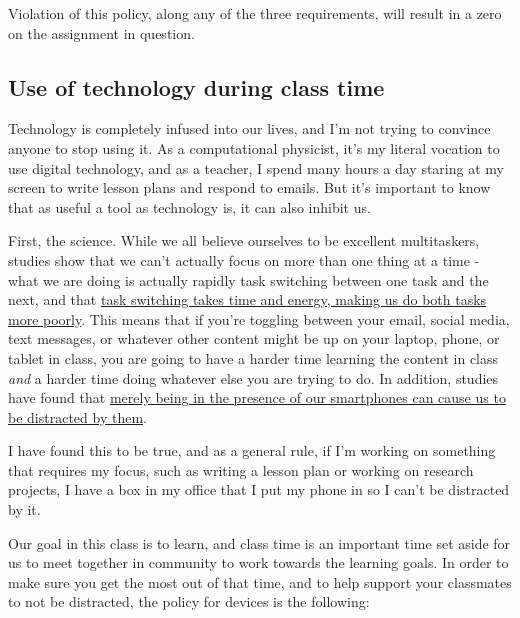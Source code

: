 \documentclass[
  letterpaper,
  DIV=11,
  numbers=noendperiod]{scrartcl}
\begin{document}
Violation of this policy, along any of the three requirements, will
result in a zero on the assignment in question.

\subsection{Use of technology during class time}\label{distractions}

Technology is completely infused into our lives, and I'm not trying to
convince anyone to stop using it. As a computational physicist, it's my
literal vocation to use digital technology, and as a teacher, I spend
many hours a day staring at my screen to write lesson plans and respond
to emails. But it's important to know that as useful a tool as
technology is, it can also inhibit us.

First, the science. While we all believe ourselves to be excellent
multitaskers, studies show that we can't actually focus on more than one
thing at a time - what we are doing is actually rapidly task switching
between one task and the next, and that
\href{https://www.apa.org/topics/research/multitasking}{task switching
takes time and energy, making us do both tasks more poorly}. This means
that if you're toggling between your email, social media, text messages,
or whatever other content might be up on your laptop, phone, or tablet
in class, you are going to have a harder time learning the content in
class \emph{and} a harder time doing whatever else you are trying to do.
In addition, studies have found that
\href{https://www.journals.uchicago.edu/doi/full/10.1086/691462}{merely
being in the presence of our smartphones can cause us to be distracted
by them}.

I have found this to be true, and as a general rule, if I'm working on
something that requires my focus, such as writing a lesson plan or
working on research projects, I have a box in my office that I put my
phone in so I can't be distracted by it.

Our goal in this class is to learn, and class time is an important time
set aside for us to meet together in community to work towards the
learning goals. In order to make sure you get the most out of that time,
and to help support your classmates to not be distracted, the policy for
devices is the following:
\end{document}
